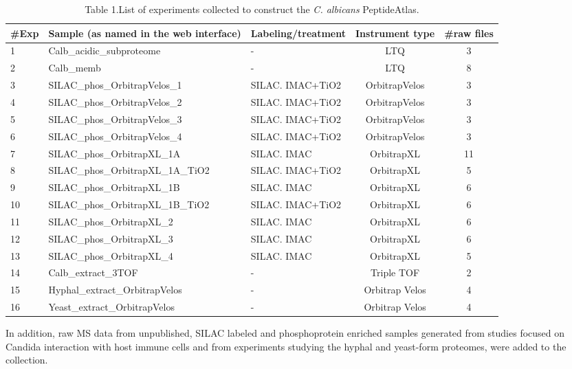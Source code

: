 \begin{table}[t]
\renewcommand{\arraystretch}{1.5}
\footnotesize
\centering
\begin{tabular}{l p{4cm} p{2cm} c c }
\hline
\#Exp & Sample \newline{} (as named in the web interface) & Labeling/treatment & Instrument type & \#raw files\\
\hline
1 & Calb\_acidic\_subproteome & - & LTQ & 3\\
2 & Calb\_memb & - & LTQ & 8\\
3 & SILAC\_phos\_OrbitrapVelos\_1 & SILAC. IMAC+TiO2 & OrbitrapVelos & 3\\
4 & SILAC\_phos\_OrbitrapVelos\_2 & SILAC. IMAC+TiO2 & OrbitrapVelos & 3\\
5 & SILAC\_phos\_OrbitrapVelos\_3 & SILAC. IMAC+TiO2 & OrbitrapVelos & 3\\
6 & SILAC\_phos\_OrbitrapVelos\_4 & SILAC. IMAC+TiO2 & OrbitrapVelos & 3\\
7 & SILAC\_phos\_OrbitrapXL\_1A & SILAC. IMAC & OrbitrapXL & 11\\
8 & SILAC\_phos\_OrbitrapXL\_1A\_TiO2 & SILAC. IMAC+TiO2 & OrbitrapXL & 5\\
9 & SILAC\_phos\_OrbitrapXL\_1B & SILAC. IMAC & OrbitrapXL & 6\\
10 & SILAC\_phos\_OrbitrapXL\_1B\_TiO2 & SILAC. IMAC+TiO2 & OrbitrapXL & 6\\
11 & SILAC\_phos\_OrbitrapXL\_2 & SILAC. IMAC & OrbitrapXL & 6\\
12 & SILAC\_phos\_OrbitrapXL\_3 & SILAC. IMAC & OrbitrapXL & 6\\
13 & SILAC\_phos\_OrbitrapXL\_4 & SILAC. IMAC & OrbitrapXL & 5\\
14 & Calb\_extract\_3TOF & - & Triple TOF & 2\\
15 & Hyphal\_extract\_OrbitrapVelos & - & Orbitrap Velos & 4\\
16 & Yeast\_extract\_OrbitrapVelos & - & Orbitrap Velos & 4\\
\end{tabular}
\caption*{Table 1.List of experiments collected to construct the \textit{C. albicans} PeptideAtlas.}
\end{table}


 

In addition, raw MS data from unpublished, SILAC labeled
and phosphoprotein enriched samples generated from studies
focused on Candida interaction with host immune cells and from
experiments studying the hyphal and yeast-form proteomes,
were added to the collection.



